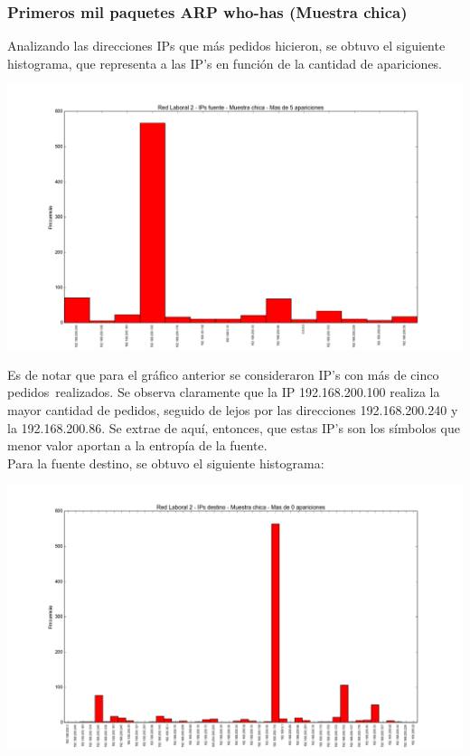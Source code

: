 \subsubsection{Primeros mil paquetes ARP who-has (Muestra chica)}

\indent \indent Analizando las direcciones IPs que más pedidos hicieron, se obtuvo el siguiente histograma, que representa a las IP's en función de la cantidad de apariciones.

\includegraphics[scale=0.5,clip=true,trim=140 0 0 0]{graphics/laburochico_src.png}


\indent Es de notar que para el gráfico anterior se consideraron IP's con más de cinco pedidos\ realizados. Se observa claramente que la IP 192.168.200.100 realiza la mayor cantidad de pedidos, seguido de lejos por las direcciones 192.168.200.240 y la 192.168.200.86. Se extrae de aquí, entonces, que estas IP's son los símbolos que menor valor aportan a la entropía de la fuente.\\

\indent Para la fuente destino, se obtuvo el siguiente histograma:

\includegraphics[scale=0.5,clip=true,trim=140 0 0 0]{graphics/laburochico_dst.png}


